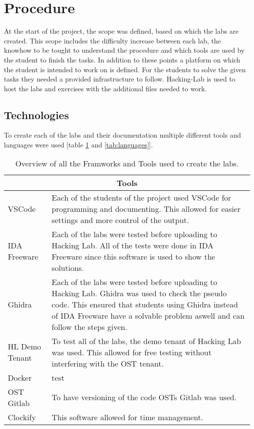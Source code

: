 \section{Procedure}
At the start of the project, the scope was defined, based on which the labs are created. This scope includes the difficulty increase between each lab, the knowhow to be tought to understand the procedure and which tools are used by the student to finish the tasks. In addition to these points a platform on which the student is intended to work on is defined.
For the students to solve the given tasks they needed a provided infrastructure to follow. Hacking-Lab is used to host the labs and exercises with the additional files needed to work.

\subsection{Technologies}
To create each of the labs and their documentation multiple different tools and languages were used [table \ref{tab:tools} and \ref{tab:languages}]. 
\begin{center}
    \begin{table}[H]
        \centering
        \begin{tabular}{ |p{4.1cm}|p{10cm}| } 
            \hline
            \multicolumn{2}{||c||}{\textbf{Tools}} \\
            \hline
            \hline
                VSCode & Each of the students of the project used VSCode for programming and documenting. This allowed for easier settings and more control of the output. \\
            \hline
                IDA Freeware & Each of the labs were tested before uploading to Hacking Lab. All of the tests were done in IDA Freeware since this software is used to show the solutions.  \\
            \hline
                Ghidra & Each of the labs were tested before uploading to Hacking Lab. Ghidra was used to check the pseudo code. This ensured that students using Ghidra instead of IDA Freeware have a solvable problem aswell and can follow the steps given. \\
            \hline
                HL Demo Tenant & 
                To test all of the labs, the demo tenant of Hacking Lab was used. This allowed for free testing without interfering with the OST tenant.  \\ 
            \hline
                Docker & test \\
            \hline
                OST Gitlab & 
                To have versioning of the code OSTs Gitlab was used.  \\ 
            \hline
                Clockify & 
                This software allowed for time management. \\ 
            \hline
        \end{tabular}
        \caption{Overview of all the Framworks and Tools used to create the labs.}
        \label{tab:tools}
    \end{table}
\end{center}

